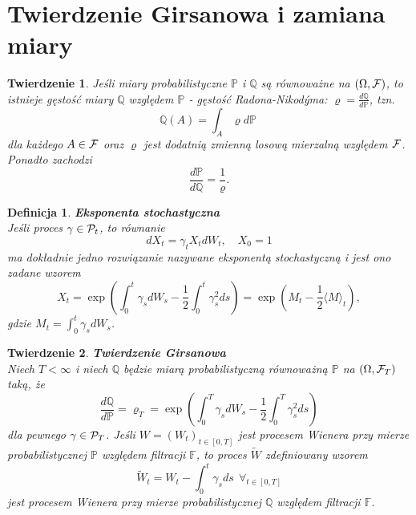 \documentclass{mini}
\theoremstyle{mythstyle}
\newtheorem{Twierdzenie}{Twierdzenie}[chapter]
\newtheorem{Definicja}{Definicja}[chapter]
\begin{document}
\section{Twierdzenie Girsanowa i zamiana miary}
\begin{Twierdzenie}
	Jeśli miary probabilistyczne $\mathbb{P}$ i $\mathbb{Q}$ są
	równoważne na $(\Omega, {\cal F})$, to istnieje gęstość miary $\mathbb{Q}$
	względem $\mathbb{P}$ - gęstość Radona-Nikod\'{y}ma: $\varrho = \frac{d
		\mathbb{Q}}{d \mathbb{P}}$, tzn.
	\begin{equation*}
	\mathbb{Q}(A) = \int_A \varrho d
	\mathbb{P}\ 
	\end{equation*}
	dla każdego $A \in {\cal F}$ oraz $\varrho$ jest dodatnią zmienną losową mierzalną względem ${\cal F}$.\\ 
	Ponadto zachodzi $$\frac{d \mathbb{P}}{d \mathbb{Q}} = \frac{1}{\varrho}.$$
\end{Twierdzenie}
\begin{Definicja}\textbf{Eksponenta stochastyczna}\\
	Jeśli proces $\gamma \in {\cal P}_t$, to równanie
	\begin{equation}
	dX_t = \gamma_t X_t dW_t,\quad X_0 = 1
	\end{equation}
	ma dokładnie jedno rozwiązanie nazywane eksponentą stochastyczną i jest ono zadane wzorem
	\begin{equation} \label{Dolean}
	X_t = \exp \left( \int_0^t \gamma_s dW_s - \frac{1}{2} \int_0^t
	\gamma_s^2 ds\right) = \exp \left(M_t - \frac{1}{2} \langle M \rangle_t \right),
	\end{equation} gdzie $M_t=\int_0^t \gamma_sdW_s$.\\ 
	
\end{Definicja}

\begin{Twierdzenie}\textbf{Twierdzenie Girsanowa}\\
	Niech $T < \infty$ i niech $\mathbb{Q}$ będzie miarą
	probabilistyczną równoważną $\mathbb{P}$ na $(\Omega, {\cal F}_T)$
	taką, że
	\begin{equation}
	\frac{d \mathbb{Q}}{d \mathbb{P}} = \varrho_T = \exp\left(\int_0^T \gamma_s d
	W_s - \frac{1}{2} \int_0^T \gamma_s^2 ds\right)
	\end{equation}
	dla pewnego $\gamma \in {\cal P}_T$. Jeśli $W = (W_t)_{t \in [0, T]}$ jest procesem Wienera przy mierze probabilistycznej $\mathbb{P}$ względem filtracji $\mathbb{F}$, to proces $\widetilde{W}$ zdefiniowany wzorem
	\[
	\widetilde{W}_t = W_t - \int_0^t \gamma_s ds \ \ \forall_{t \in [0,
		T]}
	\]
	jest procesem Wienera przy mierze probabilistycznej $\mathbb{Q}$ względem filtracji $\mathbb{F}$.\\
	
\end{Twierdzenie}
\end{document}
